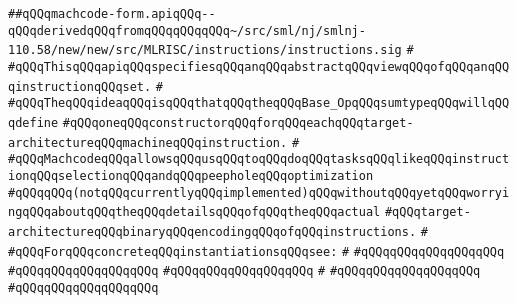 \label{src/lib/compiler/back/low/code/machcode-form.api}
\verb|##qQQqmachcode-form.apiqQQq--qQQqderivedqQQqfromqQQqqQQqqQQq~/src/sml/nj/smlnj-110.58/new/new/src/MLRISC/instructions/instructions.sig|\newline
\verb|#|\newline
\verb|#qQQqThisqQQqapiqQQqspecifiesqQQqanqQQqabstractqQQqviewqQQqofqQQqanqQQqinstructionqQQqset.|\newline
\verb|#|\newline
\verb|#qQQqTheqQQqideaqQQqisqQQqthatqQQqtheqQQqBase_OpqQQqsumtypeqQQqwillqQQqdefine|\newline
\verb|#qQQqoneqQQqconstructorqQQqforqQQqeachqQQqtarget-architectureqQQqmachineqQQqinstruction.|\newline
\verb|#|\newline
\verb|#qQQqMachcodeqQQqallowsqQQqusqQQqtoqQQqdoqQQqtasksqQQqlikeqQQqinstructionqQQqselectionqQQqandqQQqpeepholeqQQqoptimization|\newline
\verb|#qQQqqQQq(notqQQqcurrentlyqQQqimplemented)qQQqwithoutqQQqyetqQQqworryingqQQqaboutqQQqtheqQQqdetailsqQQqofqQQqtheqQQqactual|\newline
\verb|#qQQqtarget-architectureqQQqbinaryqQQqencodingqQQqofqQQqinstructions.|\newline
\verb|#|\newline
\verb|#qQQqForqQQqconcreteqQQqinstantiationsqQQqsee:|\newline
\verb|#|\newline
\verb|#qQQqqQQqqQQqqQQqqQQq|\newline
\verb|#qQQqqQQqqQQqqQQqqQQq|\newline
\verb|#qQQqqQQqqQQqqQQqqQQq|\newline
\verb|#|\newline
\verb|#qQQqqQQqqQQqqQQqqQQq|\newline
\verb|#qQQqqQQqqQQqqQQqqQQq|\newline
